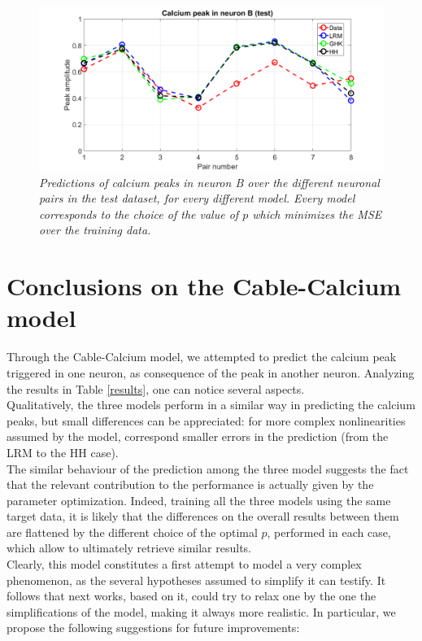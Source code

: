 \documentclass[12pt, a4paper]{report}
\begin{document}
	


\begin{figure}[H]
	\begin{center}
		\hspace*{-1.5 cm}
		\includegraphics[scale=0.5]{test_model.png} 
	\end{center} 
	\caption{\textit{Predictions of calcium peaks in neuron B over the different neuronal pairs in the test dataset, for every different model. Every model corresponds to the choice of the value of $p$ which minimizes the MSE over the training data.}}
	\label{test}
\end{figure}

\section{Conclusions on the Cable-Calcium model}

Through the Cable-Calcium model, we attempted to predict the calcium peak triggered in one neuron, as consequence of the peak in another neuron. Analyzing the results in Table \ref{results}, one can notice several aspects.\\
Qualitatively, the three models perform in a similar way in predicting the calcium peaks, but small differences can be appreciated: for more complex nonlinearities assumed by the model, correspond smaller errors in the prediction (from the LRM to the HH case).\\
The similar behaviour of the prediction among the three model suggests the fact that the relevant contribution to the performance is actually given by the parameter optimization. Indeed, training all the three models using the same target data, it is likely that the differences on the overall results between them are flattened by the different choice of the optimal $p$, performed in each case, which allow to ultimately retrieve  similar results.\\
Clearly, this model constitutes a first attempt to model a very complex phenomenon, as the several hypotheses assumed to simplify it can testify. It follows that next works, based on it, could try to relax one by the one the simplifications of the model, making it always more realistic. In particular, we propose the following suggestions for future improvements:
\end{document}
